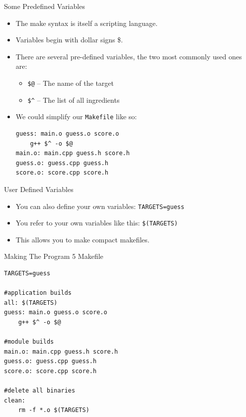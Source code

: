 \documentclass[]{beamer}
\begin{document}
\begin{frame}[fragile]{Some Predefined Variables}
\begin{itemize}[<+->]
    \item The make syntax is itself a scripting language.
    \item Variables begin with dollar signs \$.  
    \item There are several pre-defined variables, the two most
        commonly used ones are:
        \begin{itemize}
            \item \verb!$@! -- The name of the target
            \item \verb!$^! -- The list of all ingredients
        \end{itemize}
    \item We could simplify our \texttt{Makefile} like so:
\begin{adjustbox}{max width=\textwidth, max totalheight=0.9\textheight}
\begin{BVerbatim}
guess: main.o guess.o score.o
    g++ $^ -o $@
main.o: main.cpp guess.h score.h
guess.o: guess.cpp guess.h
score.o: score.cpp score.h
\end{BVerbatim}
\end{adjustbox}
\end{itemize}
\end{frame}


\begin{frame}{User Defined Variables}
\begin{itemize}[<+->]
    \item You can also define your own variables:
        \newline \texttt{TARGETS=guess}
    \item You refer to your own variables like this:
        \newline  \texttt{\$(TARGETS)}
    \item This allows you to make compact makefiles.
\end{itemize}
\end{frame}

\begin{frame}[fragile]{Making The Program 5 Makefile}
\begin{adjustbox}{max width=\textwidth, max totalheight=0.9\textheight}
\begin{BVerbatim}
TARGETS=guess

#application builds
all: $(TARGETS)
guess: main.o guess.o score.o
    g++ $^ -o $@

#module builds
main.o: main.cpp guess.h score.h
guess.o: guess.cpp guess.h
score.o: score.cpp score.h

#delete all binaries
clean:
	rm -f *.o $(TARGETS)
\end{BVerbatim}
\end{adjustbox}
\end{frame}
\end{document}
